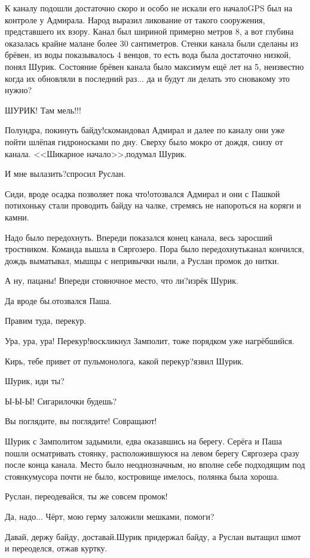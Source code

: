 К каналу подошли достаточно скоро и особо не искали его начало\mdash GPS был на контроле у Адмирала. Народ выразил ликование от такого сооружения, представшего их взору. Канал был шириной примерно метров 8, а вот глубина оказалась крайне мала\mdash не более 30 сантиметров. Стенки канала были сделаны из брёвен, из воды показывалось 4 венцов, то есть вода была достаточно низкой, понял Шурик. Состояние брёвен канала было максимум ещё лет на 5, неизвестно когда их обновляли в последний раз$\ldots$ да и будут ли делать это снова\mdash кому это нужно?

\diagdash ШУРИК! Там мель!!! 

\diagdash Полундра, покинуть байду!\mdash скомандовал Адмирал и далее по каналу они уже пойти шлёпая гидроносками по дну. Сверху было мокро от дождя, снизу от канала. <<Шикарное начало>>,\mdash подумал Шурик.

\diagdash И мне вылазить?\mdash спросил Руслан. 

\diagdash Сиди, вроде осадка позволяет пока что!\mdash отозвался Адмирал и они с Пашкой потихоньку стали проводить байду на чалке, стремясь не напороться на коряги и камни. 

Надо было передохнуть. Впереди показался конец канала, весь заросший тростником. Команда вышла в Сяргозеро. Пора было передохнуть\mdash канал кончился, дождь выматывал, мышцы с непривычки ныли, а Руслан промок до нитки.

\diagdash А ну, пацаны! Впереди стояночное место, что ли?\mdash изрёк Шурик.

\diagdash Да вроде бы.\mdash отозвался Паша.

\diagdash Правим туда, перекур. 

\diagdash Ура, ура, ура! Перекур!\mdash воскликнул Замполит, тоже порядком уже нагрёбшийся.

\diagdash Кирь, тебе привет от пульмонолога, какой перекур?\mdash язвил Шурик.

\diagdash Шурик, иди ты?

\diagdash Ы-Ы-Ы! Сигарилочки будешь?

\diagdash Вы поглядите, вы поглядите! Совращают!

Шурик с Замполитом задымили, едва оказавшись на берегу. Серёга и Паша пошли осматривать стоянку, расположившуюся на левом берегу Сяргозера сразу после конца канала. Место было неоднозначным, но вполне себе подходящим под стоянку\mdash мусора почти не было, костровище имелось, полянка была хороша. 

\diagdash Руслан, переодевайся, ты же совсем промок!

\diagdash Да, надо$\ldots$ Чёрт, мою герму заложили мешками, помоги?

\diagdash Давай, держу байду, доставай.\mdash Шурик придержал байду, а Руслан вытащил шмот и переоделся, отжав куртку. 



\begin{center}
\end{center}
